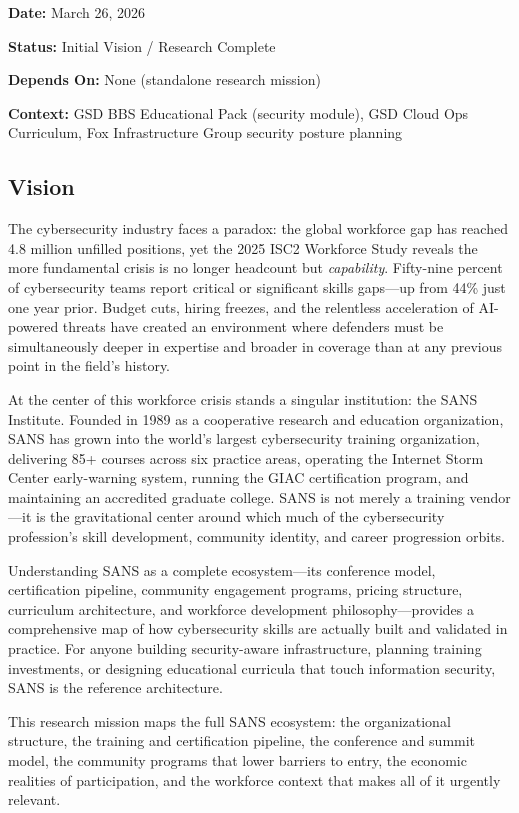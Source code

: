 \documentclass[11pt,letterpaper]{article}
\newcommand{\metafield}[2]{\textbf{\sffamily #1} #2\par}
\begin{document}
\metafield{Date:}{March 26, 2026}
\metafield{Status:}{Initial Vision / Research Complete}
\metafield{Depends On:}{None (standalone research mission)}
\metafield{Context:}{GSD BBS Educational Pack (security module), GSD Cloud Ops Curriculum, Fox Infrastructure Group security posture planning}

\subsection{Vision}

The cybersecurity industry faces a paradox: the global workforce gap has reached 4.8 million unfilled positions, yet the 2025 ISC2 Workforce Study reveals the more fundamental crisis is no longer headcount but \emph{capability}. Fifty-nine percent of cybersecurity teams report critical or significant skills gaps---up from 44\% just one year prior. Budget cuts, hiring freezes, and the relentless acceleration of AI-powered threats have created an environment where defenders must be simultaneously deeper in expertise and broader in coverage than at any previous point in the field's history.

At the center of this workforce crisis stands a singular institution: the SANS Institute. Founded in 1989 as a cooperative research and education organization, SANS has grown into the world's largest cybersecurity training organization, delivering 85+ courses across six practice areas, operating the Internet Storm Center early-warning system, running the GIAC certification program, and maintaining an accredited graduate college. SANS is not merely a training vendor---it is the gravitational center around which much of the cybersecurity profession's skill development, community identity, and career progression orbits.

Understanding SANS as a complete ecosystem---its conference model, certification pipeline, community engagement programs, pricing structure, curriculum architecture, and workforce development philosophy---provides a comprehensive map of how cybersecurity skills are actually built and validated in practice. For anyone building security-aware infrastructure, planning training investments, or designing educational curricula that touch information security, SANS is the reference architecture.

This research mission maps the full SANS ecosystem: the organizational structure, the training and certification pipeline, the conference and summit model, the community programs that lower barriers to entry, the economic realities of participation, and the workforce context that makes all of it urgently relevant.
\end{document}
